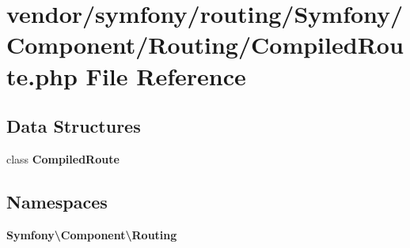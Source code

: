 \section{vendor/symfony/routing/\+Symfony/\+Component/\+Routing/\+Compiled\+Route.php File Reference}
\label{_compiled_route_8php}
\subsection*{Data Structures}
\begin{DoxyCompactItemize}
\item 
class {\bf Compiled\+Route}
\end{DoxyCompactItemize}
\subsection*{Namespaces}
\begin{DoxyCompactItemize}
\item 
 {\bf Symfony\textbackslash{}\+Component\textbackslash{}\+Routing}
\end{DoxyCompactItemize}
